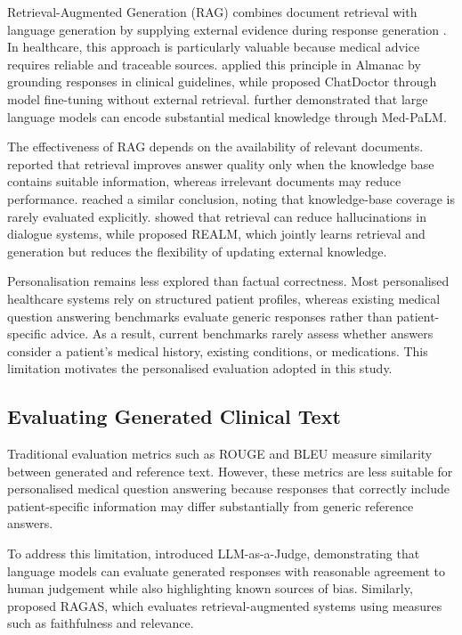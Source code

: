 Retrieval-Augmented Generation (RAG) combines document retrieval with language generation by supplying external evidence during response generation \citep{lewis2020}. In healthcare, this approach is particularly valuable because medical advice requires reliable and traceable sources. \citet{zakka2024} applied this principle in Almanac by grounding responses in clinical guidelines, while \citet{li2023} proposed ChatDoctor through model fine-tuning without external retrieval. \citet{singhal2023} further demonstrated that large language models can encode substantial medical knowledge through Med-PaLM.

The effectiveness of RAG depends on the availability of relevant documents. \citet{xiong2024} reported that retrieval improves answer quality only when the knowledge base contains suitable information, whereas irrelevant documents may reduce performance. \citet{gao2024} reached a similar conclusion, noting that knowledge-base coverage is rarely evaluated explicitly. \citet{shuster2021} showed that retrieval can reduce hallucinations in dialogue systems, while \citet{guu2020} proposed REALM, which jointly learns retrieval and generation but reduces the flexibility of updating external knowledge.

Personalisation remains less explored than factual correctness. Most personalised healthcare systems rely on structured patient profiles, whereas existing medical question answering benchmarks evaluate generic responses rather than patient-specific advice. As a result, current benchmarks rarely assess whether answers consider a patient's medical history, existing conditions, or medications. This limitation motivates the personalised evaluation adopted in this study.

\subsection{Evaluating Generated Clinical Text}

Traditional evaluation metrics such as ROUGE \citep{lin2004} and BLEU \citep{papineni2002} measure similarity between generated and reference text. However, these metrics are less suitable for personalised medical question answering because responses that correctly include patient-specific information may differ substantially from generic reference answers.

To address this limitation, \citet{zheng2023} introduced LLM-as-a-Judge, demonstrating that language models can evaluate generated responses with reasonable agreement to human judgement while also highlighting known sources of bias. Similarly, \citet{es2024} proposed RAGAS, which evaluates retrieval-augmented systems using measures such as faithfulness and relevance.

